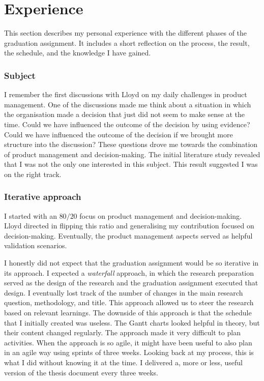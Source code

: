 \section{Experience} \label{progress}
This section describes my personal experience with the different phases of the graduation assignment. It includes a short reflection on the process, the result, the schedule, and the knowledge I have gained.

\subsubsection{Subject}
I remember the first discussions with Lloyd on my daily challenges in product management. One of the discussions made me think about a situation in which the organisation made a decision that just did not seem to make sense at the time. Could we have influenced the outcome of the decision by using evidence? Could we have influenced the outcome of the decision if we brought more structure into the discussion? These questions drove me towards the combination of product management and decision-making. The initial literature study revealed that I was not the only one interested in this subject. This result suggested I was on the right track.

\subsubsection{Iterative approach}
I started with an $80/20$ focus on product management and decision-making. Lloyd directed in flipping this ratio and generalising my contribution focused on decision-making. Eventually, the product management aspects served as helpful validation scenarios. 

I honestly did not expect that the graduation assignment would be so iterative in its approach. I expected a \emph{waterfall} approach, in which the research preparation served as the design of the research and the graduation assignment executed that design. I eventually lost track of the number of changes in the main research question, methodology, and title. This approach allowed us to steer the research based on relevant learnings. The downside of this approach is that the schedule that I initially created was useless. The Gantt charts looked helpful in theory, but their content changed regularly. The approach made it very difficult to plan activities. When the approach is so agile, it might have been useful to also plan in an agile way using sprints of three weeks. Looking back at my process, this is what I did without knowing it at the time. I delivered a, more or less, useful version of the thesis document every three weeks.

